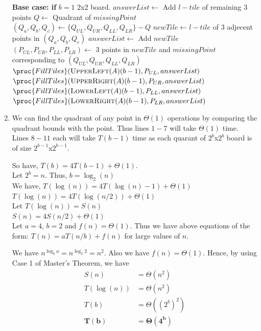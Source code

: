 \documentclass[11pt]{article}
\begin{document}
\begin{enumerate}
    \begin{codebox}
    \li \textbf{Base case: if} $b=1$
    \li \quad 2x2 board. $answerList \leftarrow$ Add $l-tile$ of remaining 3 points
    \li $Q \leftarrow$ Quadrant of $missingPoint$
    \li $(Q_a, Q_b, Q_c) \leftarrow \{Q_{UL}, Q_{UR}, Q_{LL}, Q_{LR}\} - Q$
    \li $newTile \leftarrow l-tile$ of 3 adjecent points in $(Q_a, Q_b, Q_c)$
    \li $answerList \leftarrow$ Add $newTile$ 
    \li $(P_{UL}, P_{UR}, P_{LL}, P_{LR})\leftarrow$ $3$ points in $newTile$ and $missingPoint$\\ 
    \quad\quad\quad\quad\quad\quad\quad\quad\quad
    corresponding to $(Q_{UL}, Q_{UR}, Q_{LL}, Q_{LR})$
    \li $\proc{FillTiles}(\textsc{UpperLeft}(A)(b-1), P_{UL}, answerList)$
    \li $\proc{FillTiles}(\textsc{UpperRight}(A)(b-1), P_{UR}, answerList)$
    \li $\proc{FillTiles}(\textsc{LowerLeft}(A)(b-1), P_{LL}, answerList)$
    \li $\proc{FillTiles}(\textsc{LowerRight}(A)(b-1), P_{LR}, answerList)$
    \end{codebox}
\newpage
\item 
We can find the quadrant of any point in $\Theta(1)$ operations by comparing the quadrant bounds with the point. Thus lines $1-7$ will take $\Theta(1)$ time.\\
Lines $8-11$ each will take $T(b-1)$ time as each quarant of $2^b$x$2^b$ board is of size $2^{b-1}$x$2^{b-1}$.

So have, $T(b) = 4T(b-1) + \Theta(1)$.\\
Let $2^b = n$. Thus, $b = \log_2(n)$\\
We have, $T(\log(n)) = 4T(\log(n)-1)+\Theta(1)$\\
$T(\log(n)) = 4T(\log(n/2))+\Theta(1)$\\
Let $T(\log(n)) = S(n)$\\
$S(n) = 4S(n/2)+\Theta(1)$\\

Let $a = 4$, $b=2$ and $f(n) = \Theta(1)$. Thus we have above equations of the form:
$T(n) = aT(n/b) + f(n)$ for large values of $n$.

We have $n^{\log_b a} = n^{\log_{2} 2} = n^2$. Also we have $f(n) = \Theta(1)$. Hence, by using Case 1 of Master's Theorem, we have
    \begin{equation}
        \begin{split}
           S(n) &= \Theta(n^2)\\
           T(\log(n)) &= \Theta(n^2)\\
           T(b) &= \Theta((2^b)^2)\\
           \mathbf{T(b)} &= \mathbf{\Theta(4^b)}
        \end{split}
    \end{equation}
\end{enumerate}
\end{document}
